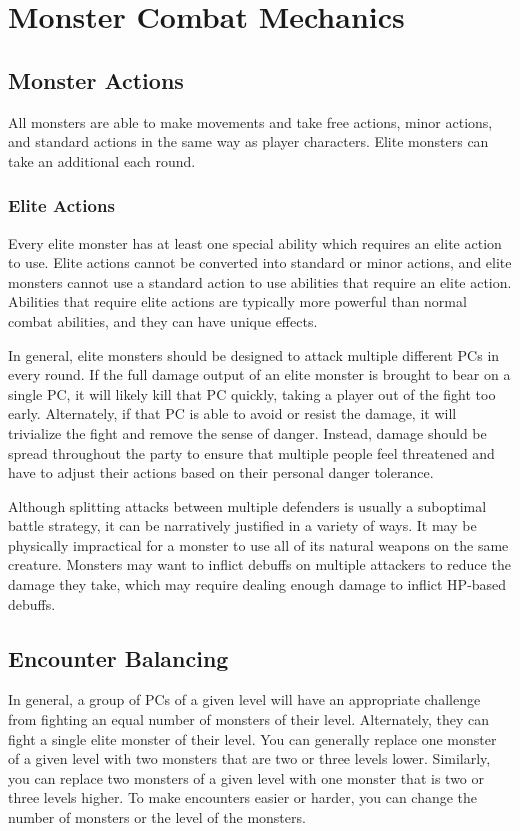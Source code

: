 \section{Monster Combat Mechanics}

    \subsection{Monster Actions}\label{Monster Actions}
        All monsters are able to make movements and take free actions, minor actions, and standard actions in the same way as player characters.
        Elite monsters can take an additional  each round.

        \subsubsection{Elite Actions}\label{Elite Actions}
            Every elite monster has at least one special ability which requires an elite action to use.
            Elite actions cannot be converted into standard or minor actions, and elite monsters cannot use a standard action to use abilities that require an elite action.
            Abilities that require elite actions are typically more powerful than normal combat abilities, and they can have unique effects.

            In general, elite monsters should be designed to attack multiple different PCs in every round.
            If the full damage output of an elite monster is brought to bear on a single PC, it will likely kill that PC quickly, taking a player out of the fight too early.
            Alternately, if that PC is able to avoid or resist the damage, it will trivialize the fight and remove the sense of danger.
            Instead, damage should be spread throughout the party to ensure that multiple people feel threatened and have to adjust their actions based on their personal danger tolerance.

            Although splitting attacks between multiple defenders is usually a suboptimal battle strategy, it can be narratively justified in a variety of ways.
            It may be physically impractical for a monster to use all of its natural weapons on the same creature.
            Monsters may want to inflict debuffs on multiple attackers to reduce the damage they take, which may require dealing enough damage to inflict HP-based debuffs.

    \subsection{Encounter Balancing}\label{Encounter Balancing}
        In general, a group of PCs of a given level will have an appropriate challenge from fighting an equal number of monsters of their level.
        Alternately, they can fight a single elite monster of their level.
        You can generally replace one monster of a given level with two monsters that are two or three levels lower.
        Similarly, you can replace two monsters of a given level with one monster that is two or three levels higher.
        To make encounters easier or harder, you can change the number of monsters or the level of the monsters.

